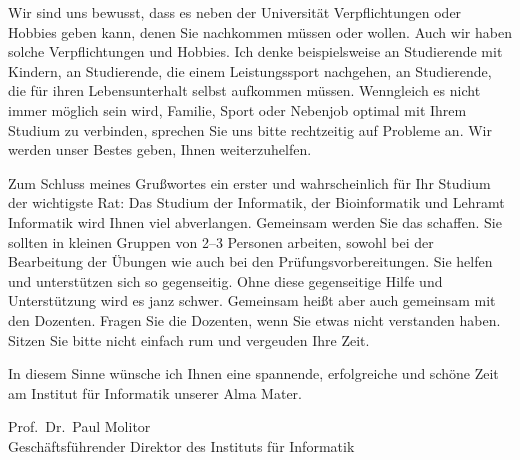 Wir sind uns bewusst, dass es neben der Universität Verpflichtungen oder Hobbies
geben kann, denen Sie nachkommen müssen oder wollen. Auch wir haben solche
Verpflichtungen und Hobbies. Ich denke beispielsweise an Studierende mit
Kindern, an Studierende, die einem Leistungssport nachgehen, an Studierende, die
für  ihren Lebensunterhalt selbst aufkommen müssen. Wenngleich es nicht immer
möglich sein wird, Familie, Sport oder Nebenjob optimal mit Ihrem Studium zu
verbinden, sprechen Sie uns bitte rechtzeitig auf Probleme an. Wir werden unser
Bestes geben, Ihnen weiterzuhelfen.

Zum Schluss meines Grußwortes ein erster und wahrscheinlich für Ihr Studium der
wichtigste Rat: Das Studium der Informatik, der Bioinformatik und Lehramt
Informatik wird Ihnen viel abverlangen. Gemeinsam werden Sie das schaffen. Sie
sollten in kleinen Gruppen von 2--3 Personen arbeiten, sowohl bei der
Bearbeitung der Übungen wie auch bei den Prüfungsvorbereitungen. Sie helfen und
unterstützen sich so gegenseitig. Ohne diese gegenseitige Hilfe und
Unterstützung wird es janz schwer. Gemeinsam heißt aber auch gemeinsam mit den
Dozenten. Fragen Sie die Dozenten, wenn Sie etwas nicht verstanden haben. Sitzen
Sie bitte nicht einfach rum und vergeuden Ihre Zeit.

In diesem Sinne wünsche ich Ihnen eine spannende, erfolgreiche und schöne Zeit
am Institut für Informatik unserer Alma Mater.

Prof.\ Dr.\ Paul Molitor \\
Geschäftsführender Direktor des Instituts für Informatik
